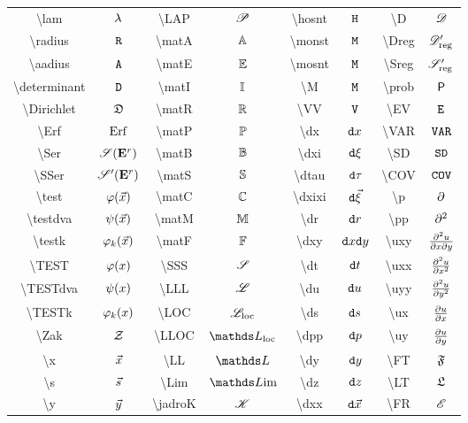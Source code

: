 \begin{tabular}{cccccccc}
\textbackslash lam&$\lambda$&\textbackslash LAP&${\mathscr P}$&\textbackslash hosnt&$\mathtt{H}$&\textbackslash D&${\mathscr{D}}$\\
\textbackslash radius&$\mathtt{R}$&\textbackslash matA&${\mathbb A}$&\textbackslash monst&$\mathtt{M}$&\textbackslash Dreg&${{\mathscr{D}}'_{\mathrm{reg}}}$\\
\textbackslash aadius&$\mathtt{A}$&\textbackslash matE&${\mathbb E}$&\textbackslash mosnt&$\mathtt{M}$&\textbackslash Sreg&${{\mathscr S}'_{\mathrm{reg}}}$\\
\textbackslash determinant&$\mathtt{D}$&\textbackslash matI&${\mathbb I}$&\textbackslash M&$\mathtt{M}$&\textbackslash prob&$\mbox{\sf P}$\\
\textbackslash Dirichlet&$\mathfrak{D}$&\textbackslash matR&${\mathbb R}$&\textbackslash VV&$\mathtt{V}$&\textbackslash EV&$\mathtt{E}$\\
\textbackslash Erf&$\mathrm{Erf}$&\textbackslash matP&${\mathbb P}$&\textbackslash dx&$\mathtt{d}x$&\textbackslash VAR&$\mathtt{VAR}$\\
\textbackslash Ser&${\mathscr S}({{\mathbf E}^r})$&\textbackslash matB&${\mathbb B}$&\textbackslash dxi&$\mathtt{d}\xi$&\textbackslash SD&$\mathtt{SD}$\\
\textbackslash SSer&${\mathscr S}'({{\mathbf E}^r})$&\textbackslash matS&${\mathbb S}$&\textbackslash dtau&$\mathtt{d}\tau$&\textbackslash COV&$\mathtt{COV}$\\
\textbackslash test&$\varphi({\vec{x}})$&\textbackslash matC&${\mathbb C}$&\textbackslash dxixi&$\mathtt{d}\vec{\xi}$&\textbackslash p&$\partial$\\
\textbackslash testdva&$\psi({\vec{x}})$&\textbackslash matM&${\mathbb M}$&\textbackslash dr&$\mathtt{d}r$&\textbackslash pp&$\partial^2$\\
\textbackslash testk&$\varphi_k({\vec{x}})$&\textbackslash matF&${\mathbb F}$&\textbackslash dxy&$\mathtt{d}x\mathtt{d}y$&\textbackslash uxy&$\frac{\partial^2 u}{\partial x\partial y}$\\
\textbackslash TEST&$\varphi(x)$&\textbackslash SSS&${\mathscr S}$&\textbackslash dt&$\mathtt{d}t$&\textbackslash uxx&$\frac{\partial^2 u}{\partial x^2}$\\
\textbackslash TESTdva&$\psi(x)$&\textbackslash LLL&${\mathscr L}$&\textbackslash du&$\mathtt{d}u$&\textbackslash uyy&$\frac{\partial^2 u}{\partial y^2}$\\
\textbackslash TESTk&$\varphi_k(x)$&\textbackslash LOC&$\mathscr{L}_{\mathrm{loc}}$&\textbackslash ds&$\mathtt{d}s$&\textbackslash ux&$\frac{\partial u}{\partial x}$\\
\textbackslash Zak&${\mathcal Z}$&\textbackslash LLOC&$\LLOC$&\textbackslash dpp&$\mathtt{d}p$&\textbackslash uy&$\frac{\partial u}{\partial y}$\\
\textbackslash x&${\vec{x}}$&\textbackslash LL&$\LL$&\textbackslash dy&$\mathtt{d}y$&\textbackslash FT&$\mathfrak{F}$\\
\textbackslash s&${\vec{s}}$&\textbackslash Lim&$\Lim$&\textbackslash dz&$\mathtt{d}z$&\textbackslash LT&$\mathfrak{L}$\\
\textbackslash y&${\vec{y}}$&\textbackslash jadroK&${\mathscr K}$&\textbackslash dxx&$\mathtt{d}{\vec{x}}$&\textbackslash FR&$\mathscr{E}$\\

\end{tabular}
